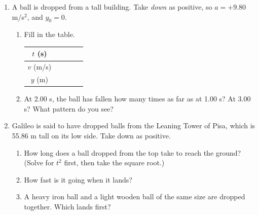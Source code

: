 \documentclass[12pt, twoside]{article}
\begin{document}
\begin{enumerate}[itemsep=0.4cm]

\item A ball is dropped from a tall building. Take \emph{down} as positive, so
  $a = +9.80$ m/s$^2$, and $y_0 = 0$.
  \begin{enumerate}[itemsep=0.4cm]
    \item Fill in the table.

      \vspace{0.1cm}
      \renewcommand{\arraystretch}{1.5}
      \begin{tabular}{| c | p{1.6cm} | p{1.6cm} | p{1.6cm} | p{1.6cm} |}
        \hline
        $t$ (s) & \centering 0 & \centering 1.00 & \centering 2.00 &
          \centering\arraybackslash 3.00 \\ \hline
        $v$ (m/s) & & & & \\ \hline
        $y$ (m) & & & & \\ \hline
      \end{tabular}
    \item At 2.00 s, the ball has fallen how many times as far as at 1.00 s? At
      3.00 s? What pattern do you see?
      \vspace{1.2cm}
  \end{enumerate}

\item Galileo is said to have dropped balls from the Leaning Tower of Pisa, which is
  55.86 m tall on its low side. Take down as positive.
  \begin{enumerate}[itemsep=0.4cm]
    \item How long does a ball dropped from the top take to reach the ground?
      (Solve for $t^2$ first, then take the square root.)
      \vspace{2.2cm}
    \item How fast is it going when it lands?
      \vspace{1.6cm}
    \item A heavy iron ball and a light wooden ball of the same size are dropped
      together. Which lands first?
  \end{enumerate}

\newpage


\end{enumerate}
\end{document}
